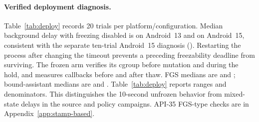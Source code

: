 \paragraph{Verified deployment diagnosis.} Table~\ref{tab:deploy} records 20 trials per platform/configuration. Median background delay with freezing disabled is \FollowABg on Android~13 and \FollowBBg on Android~15, consistent with the separate ten-trial Android~15 diagnosis (\RevDeployBBg). Restarting the process after changing the timeout prevents a preceding freezability deadline from surviving. The frozen arm verifies its cgroup before mutation and during the hold, and measures callbacks before and after thaw. FGS medians are \FollowAFg and \FollowBFg; bound-assistant medians are \FollowAAssist and \FollowBAssist. Table~\ref{tab:deploy} reports ranges and denominators. This distinguishes the 10-second unfrozen behavior from mixed-state delays in the source and policy campaigns. API-35 FGS-type checks are in Appendix~\ref{app:stamp-based}.
